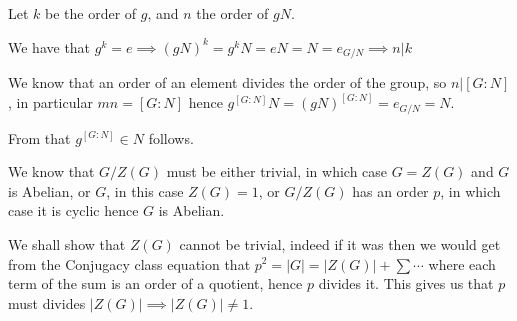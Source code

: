 \begin{cExercise}
	\begin{cPart}
		Let $k$ be the order of $g$, and $n$ the order of $gN$.
		
		We have that $g^k=e\implies (gN)^k=g^kN=eN=N=e_{G/N}\implies n|k$
	\end{cPart}
	\begin{cPart}
		We know that an order of an element divides the order of the group, so $n|[G:N]$, in particular $mn=[G:N]$ hence $g^{[G:N]}N=(gN)^{[G:N]}=e_{G/N}=N$.
		
		From that $g^{[G:N]}\in N$ follows.
	\end{cPart}
\end{cExercise}
\begin{cExercise}
	We know that $G/Z(G)$ must be either trivial, in which case $G=Z(G)$ and $G$ is Abelian, or $G$, in this case $Z(G)=1$, or $G/Z(G)$ has an order $p$, in which case it is cyclic hence $G$ is Abelian.
	
	We shall show that $Z(G)$ cannot be trivial, indeed if it was then we would get from the Conjugacy class equation that $p^2=|G|=|Z(G)|+\sum\cdots$ where each term of the sum is an order of a quotient, hence $p$ divides it. This gives us that $p$ must divides $|Z(G)|\implies |Z(G)|\ne 1$.
\end{cExercise}
